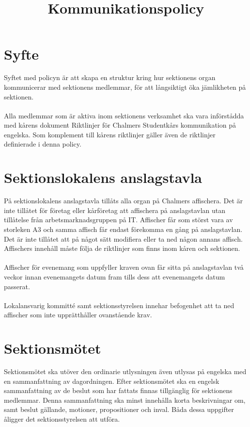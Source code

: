 \documentclass[11pt, includeaddress]{classes/cthit}
\begin{document}
\title{Kommunikationspolicy}

\maketitle

\thispagestyle{empty}

\newpage

\makeheadfoot%

\setcounter{tocdepth}{2}
\setcounter{page}{1}
\tableofcontents

\newpage

\section{Syfte}
Syftet med policyn är att skapa en struktur kring hur sektionens organ kommunicerar med sektionens medlemmar, för att långsiktigt öka jämlikheten på sektionen.\\
 \\
Alla medlemmar som är aktiva inom sektionens verksamhet ska vara införstådda med kårens dokument Riktlinjer för Chalmers Studentkårs kommunikation på engelska. Som komplement till kårens riktlinjer gäller även de riktlinjer definierade i denna policy. 

\section{Sektionslokalens anslagstavla}
På sektionslokalens anslagstavla tillåts alla organ på Chalmers affischera. Det är inte tillåtet för företag eller kårföretag att affischera på anslagstavlan utan tillåtelse från arbetsmarknadsgruppen på IT. Affischer får som störst vara av storleken A3 och samma affisch får endast förekomma en gång på anslagstavlan. Det är inte tillåtet att på något sätt modifiera eller ta ned någon annans affisch. Affischers innehåll måste följa de riktlinjer som finns inom kåren och sektionen. \\
 \\
Affischer för evenemang som uppfyller kraven ovan får sitta på anslagstavlan två veckor innan evenemangets datum fram tills dess att evenemangets datum passerat. \\
 \\
Lokalansvarig kommitté samt sektionsstyrelsen innehar befogenhet att ta ned affischer som inte upprätthåller ovanstående krav. 

\section{Sektionsmötet}
Sektionsmötet ska utöver den ordinarie utlysningen även utlysas på engelska med en sammanfattning av dagordningen. Efter sektionsmötet ska en engelsk sammanfattning av de beslut som har fattats finnas tillgänglig för sektionens medlemmar. Denna sammanfattning ska minst innehålla korta beskrivningar om, samt beslut gällande, motioner, propositioner och inval. Båda dessa uppgifter åligger det sektionsstyrelsen att utföra.
\end{document}
